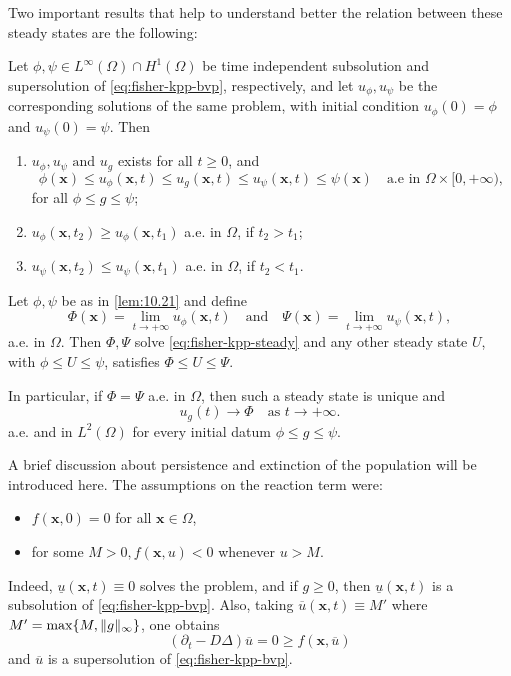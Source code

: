 Two important results that help to understand better the relation between these steady states are the following:
\begin{lemma}
    Let \(\phi, \psi \in L^\infty(\Omega) \cap H^1(\Omega)\) be time independent subsolution and supersolution of \eqref{eq:fisher-kpp-bvp}, respectively, and let \(u_\phi, u_\psi\) be the corresponding solutions of the same problem, with initial condition \(u_\phi(0) = \phi\) and \(u_\psi(0) = \psi\). Then
    \begin{enumerate}
        \item \(u_\phi, u_\psi \text{ and } u_g\) exists for all \(t \geq 0\), and 
        \begin{equation}
            \phi(\bm{x}) \leq u_\phi(\bm{x}, t) \leq u_g(\bm{x}, t) \leq u_\psi(\bm{x}, t) \leq \psi(\bm{x}) \quad \text{a.e in } \Omega \times [0, +\infty),
        \end{equation}
        for all \(\phi \leq g \leq \psi\);
        \item \(u_\phi(\bm{x}, t_2) \geq u_\phi(\bm{x}, t_1)\) a.e. in \(\Omega\), if \(t_2 > t_1\);
        \item \(u_\psi(\bm{x}, t_2) \leq u_\psi(\bm{x}, t_1)\) a.e. in \(\Omega\), if \(t_2 < t_1\).
    \end{enumerate}
    \label{lem:10.21}
\end{lemma}
\begin{theorem}
    Let \(\phi, \psi\) be as in \ref{lem:10.21} and define 
    \[
        \Phi(\bm{x}) = \lim_{t \to +\infty} u_\phi(\bm{x}, t) \quad \text{and} \quad \Psi(\bm{x}) = \lim_{t \to +\infty} u_\psi(\bm{x}, t),
    \]
    a.e. in \(\Omega\). Then \(\Phi, \Psi \) solve \eqref{eq:fisher-kpp-steady} and any other steady state \(U\), with \(\phi \leq U \leq \psi\), satisfies \(\Phi \leq U \leq \Psi\).
    
    In particular, if \(\Phi = \Psi\) a.e. in \(\Omega\), then such a steady state is unique and 
    \[
        u_g(t) \to \Phi \quad \text{as } t \to +\infty.
    \]
    a.e. and in \(L^2(\Omega)\) for every initial datum \(\phi \leq g \leq \psi\).
    \label{thm:10.22}
\end{theorem}

A brief discussion about persistence and extinction of the population will be introduced here. 
The assumptions on the reaction term were:
\begin{itemize}
    \item \(f(\bm{x}, 0) = 0\) for all \(\bm{x} \in \Omega\),
    \item for some \(M > 0, f(\bm{x}, u) < 0\) whenever \(u > M\).
\end{itemize}
Indeed, \(\underline{u}(\bm{x}, t) \equiv 0\) solves the problem, and if \(g \geq 0\), then \(\underline{u}(\bm{x}, t)\) is a subsolution of \eqref{eq:fisher-kpp-bvp}. Also, taking \(\overline{u}(\bm{x}, t) \equiv M'\) where \(M' = \max\{M, \lVert g\rVert_\infty\}\), one obtains
\[
    \left(\partial_t - D\Delta\right)\overline{u} = 0 \geq f(\bm{x}, \overline{u}) 
\]
and \(\overline{u}\) is a supersolution of \eqref{eq:fisher-kpp-bvp}. 

